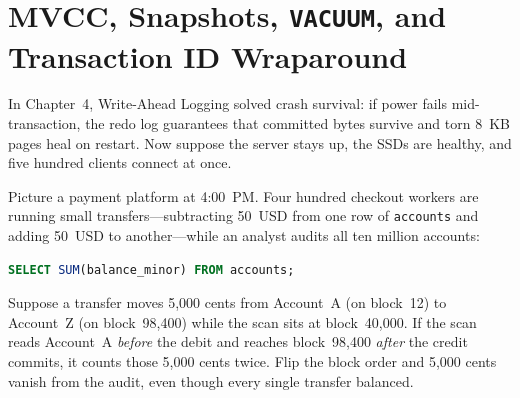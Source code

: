 \chapter{MVCC, Snapshots, \texttt{VACUUM}, and Transaction ID Wraparound}

In Chapter~4, Write-Ahead Logging solved crash survival: if power fails mid-transaction, the redo log guarantees that committed bytes survive and torn 8~KB pages heal on restart. Now suppose the server stays up, the SSDs are healthy, and five hundred clients connect at once.

Picture a payment platform at 4:00~PM. Four hundred checkout workers are running small transfers---subtracting 50~USD from one row of \texttt{accounts} and adding 50~USD to another---while an analyst audits all ten million accounts:

\begin{lstlisting}[language=SQL]
SELECT SUM(balance_minor) FROM accounts;
\end{lstlisting}

Suppose a transfer moves 5,000 cents from Account~A (on block~12) to Account~Z (on block~98,400) while the scan sits at block~40,000. If the scan reads Account~A \emph{before} the debit and reaches block~98,400 \emph{after} the credit commits, it counts those 5,000 cents twice. Flip the block order and 5,000 cents vanish from the audit, even though every single transfer balanced.

